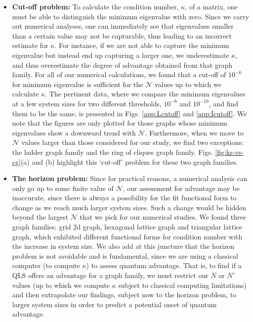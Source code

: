 \documentclass[%
 reprint,
 superscriptaddress,
 amsmath,amssymb,
 aps,
 pra,
floatfix,
nofootinbib,
]{revtex4-2}
\theoremstyle{definition}
\theoremstyle{remark}
\begin{document}
\begin{appendix}
\begin{itemize}
\item \textbf{Cut-off problem: }To calculate the condition number, $\kappa$, of a matrix, one must be able to distinguish the minimum eigenvalue with zero. Since we carry out numerical analyses, one can immediately see that eigenvalues smaller than a certain value may not be capturable, thus leading to an incorrect estimate for $\kappa$. For instance, if we are not able to capture the minimum eigenvalue but instead end up capturing a larger one, we underestimate $\kappa$, and thus overestimate the degree of advantage obtained from that graph family. For all of our numerical calculations, we found that a cut-off of $10^{-6}$ for minimum eigenvalue is sufficient for the $\mathcal{N}$ values up to which we calculate $\kappa$. The pertinent data, where we compare the minimum eigenvalues at a few system sizes for two different thresholds, $10^{-6}$ and $10^{-10}$, and find them to be the same, is presented in Figs. \ref{app:Lcutoff} and \ref{app:Icutoff}. We note that the figures are only plotted for those graphs whose minimum eigenvalues show a downward trend with $\mathcal{N}$. Furthermore, when we move to $\mathcal{N}$ values larger than those considered for our study, we find two exceptions: the ladder graph family and the ring of cliques graph family. Figs. \ref{fig:ks-vs-cg}(a) and (b) highlight this `cut-off' problem for these two graph families. 

\item \textbf{The horizon problem: }Since for practical reasons, a numerical analysis can only go up to some finite value of $\mathcal{N}$, our assessment for advantage may be inaccurate, since there is always a possibility for the fit functional form to change as we reach much larger system sizes. Such a change would be hidden beyond the largest $\mathcal{N}$ that we pick for our numerical studies. We found three graph families: grid 2d graph, hexagonal lattice graph and triangular lattice graph, which exhibited different functional forms for condition number with the increase in system size. We also add at this juncture that the horizon problem is not avoidable and is fundamental, since we are using a classical computer (to compute $\kappa$) to assess quantum advantage. That is, to find if a QLS offers an advantage for a graph family, we must restrict our $N$ or $N'$ values (up to which we compute $\kappa$ subject to classical computing limitations) and then extrapolate our findings, subject now to the horizon problem, to larger system sizes in order to predict a potential onset of quantum advantage. 


\end{itemize}
\end{appendix}
\end{document}
